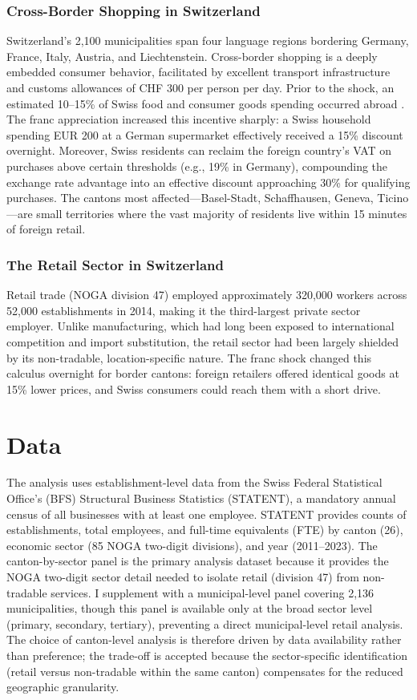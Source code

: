 \documentclass[12pt]{article}
\begin{document}
\subsubsection*{Cross-Border Shopping in Switzerland} Switzerland's 2,100 municipalities span four language regions bordering Germany, France, Italy, Austria, and Liechtenstein. Cross-border shopping is a deeply embedded consumer behavior, facilitated by excellent transport infrastructure and customs allowances of CHF 300 per person per day. Prior to the shock, an estimated 10--15\% of Swiss food and consumer goods spending occurred abroad \citep{GfK2018}. The franc appreciation increased this incentive sharply: a Swiss household spending EUR 200 at a German supermarket effectively received a 15\% discount overnight. Moreover, Swiss residents can reclaim the foreign country's VAT on purchases above certain thresholds (e.g., 19\% in Germany), compounding the exchange rate advantage into an effective discount approaching 30\% for qualifying purchases. The cantons most affected---Basel-Stadt, Schaffhausen, Geneva, Ticino---are small territories where the vast majority of residents live within 15 minutes of foreign retail.

\subsubsection*{The Retail Sector in Switzerland} Retail trade (NOGA division 47) employed approximately 320,000 workers across 52,000 establishments in 2014, making it the third-largest private sector employer. Unlike manufacturing, which had long been exposed to international competition and import substitution, the retail sector had been largely shielded by its non-tradable, location-specific nature. The franc shock changed this calculus overnight for border cantons: foreign retailers offered identical goods at 15\% lower prices, and Swiss consumers could reach them with a short drive.

\section{Data}

The analysis uses establishment-level data from the Swiss Federal Statistical Office's (BFS) Structural Business Statistics (STATENT), a mandatory annual census of all businesses with at least one employee. STATENT provides counts of establishments, total employees, and full-time equivalents (FTE) by canton (26), economic sector (85 NOGA two-digit divisions), and year (2011--2023). The canton-by-sector panel is the primary analysis dataset because it provides the NOGA two-digit sector detail needed to isolate retail (division 47) from non-tradable services. I supplement with a municipal-level panel covering 2,136 municipalities, though this panel is available only at the broad sector level (primary, secondary, tertiary), preventing a direct municipal-level retail analysis. The choice of canton-level analysis is therefore driven by data availability rather than preference; the trade-off is accepted because the sector-specific identification (retail versus non-tradable within the same canton) compensates for the reduced geographic granularity.
\end{document}
